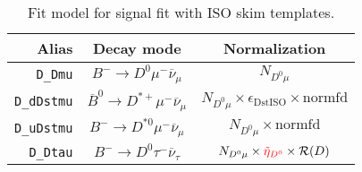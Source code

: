 \begin{landscape}
\begin{table}
\centering
\caption{
    Fit model for \Dz signal fit with ISO skim templates.
}
\scriptsize

\begin{tabular}{r|c|c}
\toprule
           \textbf{Alias} &                                 \textbf{Decay mode}                                  &                                                                                                                                                                            \textbf{Normalization}                                                                                                                                                                             \\
\midrule
          \texttt{D\_Dmu} &                    $B^- \rightarrow D^0 \mu^- \overline{\nu}_\mu$                    &                                                                                                                                                                                 $N_{D^0 \mu}$                                                                                                                                                                                 \\
       \texttt{D\_dDstmu} &             $\overline{B}^0 \rightarrow D^{*+} \mu^- \overline{\nu}_\mu$             &                                                                                                                                                       $N_{D^0 \mu} \times \epsilon_\text{DstISO} \times \text{normfd}$                                                                                                                                                        \\
       \texttt{D\_uDstmu} &                  $B^- \rightarrow D^{*0} \mu^- \overline{\nu}_\mu$                   &                                                                                                                                                                      $N_{D^0 \mu} \times \text{normfd}$                                                                                                                                                                       \\
         \texttt{D\_Dtau} &                   $B^- \rightarrow D^0 \tau^- \overline{\nu}_\tau$                   &                                                                                                                                                $N_{D^0 \mu} \times \textcolor{red}{\tilde{\eta}_{D^0}} \times \mathcal{R}(D)$                                                                                                                                                 \\

\end{tabular}
\end{table}
\end{landscape}
